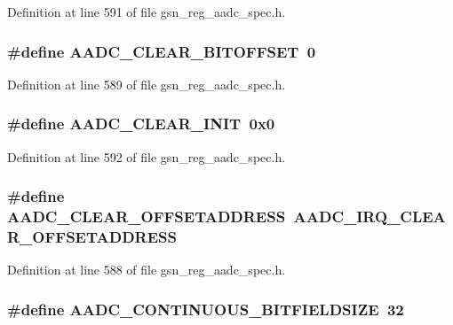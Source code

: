 Definition at line 591 of file gsn\_\-reg\_\-aadc\_\-spec.h.

\hypertarget{a00543_ad52b4235cc5b55a7ae100b415cc68df7}{
\subsubsection[{AADC\_\-CLEAR\_\-BITOFFSET}]{\setlength{\rightskip}{0pt plus 5cm}\#define AADC\_\-CLEAR\_\-BITOFFSET~0}}
\label{a00543_ad52b4235cc5b55a7ae100b415cc68df7}


Definition at line 589 of file gsn\_\-reg\_\-aadc\_\-spec.h.

\hypertarget{a00543_a832ae19400da9482101be3e6c44d635d}{
\subsubsection[{AADC\_\-CLEAR\_\-INIT}]{\setlength{\rightskip}{0pt plus 5cm}\#define AADC\_\-CLEAR\_\-INIT~0x0}}
\label{a00543_a832ae19400da9482101be3e6c44d635d}


Definition at line 592 of file gsn\_\-reg\_\-aadc\_\-spec.h.

\hypertarget{a00543_a0981e9bb59a70dc59ecdae3856fefe5c}{
\subsubsection[{AADC\_\-CLEAR\_\-OFFSETADDRESS}]{\setlength{\rightskip}{0pt plus 5cm}\#define AADC\_\-CLEAR\_\-OFFSETADDRESS~AADC\_\-IRQ\_\-CLEAR\_\-OFFSETADDRESS}}
\label{a00543_a0981e9bb59a70dc59ecdae3856fefe5c}


Definition at line 588 of file gsn\_\-reg\_\-aadc\_\-spec.h.

\hypertarget{a00543_acf04de174f3f0354487b7823f09e2bd2}{
\subsubsection[{AADC\_\-CONTINUOUS\_\-BITFIELDSIZE}]{\setlength{\rightskip}{0pt plus 5cm}\#define AADC\_\-CONTINUOUS\_\-BITFIELDSIZE~32}}
\label{a00543_acf04de174f3f0354487b7823f09e2bd2}


